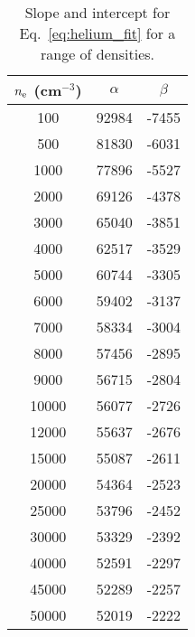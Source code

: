 \documentclass[fleqn,usenatbib]{mnras}
\begin{document}
\begin{table}
\caption{Slope and intercept for Eq.~\ref{eq:helium_fit} for a range of densities.}
\label{tab:slopes}
\begin{tabular}{ccc}
\hline
$n_{\rm e}$ (cm$^{-3}$) & $\alpha$ & $\beta$\\
\hline
100 & 92984 & -7455 \\
500 & 81830 & -6031 \\
1000 & 77896 & -5527 \\
2000 & 69126 & -4378 \\
3000 & 65040 & -3851 \\
4000 & 62517 & -3529 \\
5000 & 60744 & -3305 \\
6000 & 59402 & -3137 \\
7000 & 58334 & -3004 \\
8000 & 57456 & -2895 \\
9000 & 56715 & -2804 \\
10000 & 56077 & -2726 \\
12000 & 55637 & -2676 \\
15000 & 55087 & -2611 \\
20000 & 54364 & -2523 \\
25000 & 53796 & -2452 \\
30000 & 53329 & -2392 \\
40000 & 52591 & -2297 \\
45000 & 52289 & -2257 \\
50000 & 52019 & -2222 \\
\hline
\end{tabular}
\end{table}
\end{document}
